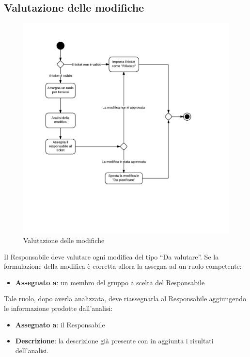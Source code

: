 \subsection{Valutazione delle modifiche}

\begin{figure}[H]
    \centering
    \includegraphics[width=1.2\textwidth]{uml-processi/Valutazione_delle_modifiche.png}
    \caption{Valutazione delle modifiche}
\end{figure}

Il Responsabile deve valutare ogni modifica del tipo ``Da valutare''. Se la formulazione della modifica è corretta allora la assegna ad un ruolo competente:
\begin{itemize}
 \item \textbf{Assegnato a}: un membro del gruppo a scelta del Responsabile
\end{itemize}

Tale ruolo, dopo averla analizzata, deve riassegnarla al Responsabile aggiungendo le informazione prodotte dall'analisi:
\begin{itemize}
 \item \textbf{Assegnato a}: il Responsabile
 \item \textbf{Descrizione}: la descrizione già presente con in aggiunta i risultati dell'analisi.
\end{itemize}


